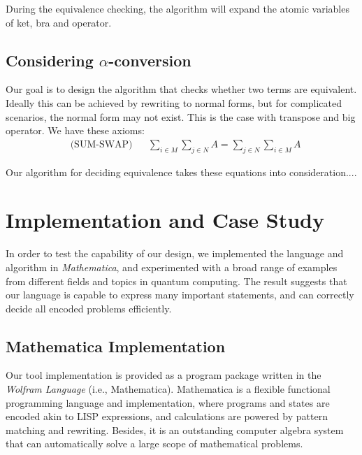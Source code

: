 \documentclass[manuscript, review, timestamp]{acmart}
\begin{document}
During the equivalence checking, the algorithm will expand the atomic variables of ket, bra and operator.

\subsection{Considering $\alpha$-conversion}

Our goal is to design the algorithm that checks whether two terms are equivalent. Ideally this can be achieved by rewriting to normal forms, but for complicated scenarios, the normal form may not exist. This is the case with transpose and big operator. We have these axioms: 
\begin{align*}
& \text{(SUM-SWAP)} && \sum_{i \in M} \sum_{j \in N} A = \sum_{j \in N} \sum_{i \in M} A 
\end{align*}

Our algorithm for deciding equivalence takes these equations into consideration....



\section{Implementation and Case Study}

In order to test the capability of our design, we implemented the language and algorithm in \textit{Mathematica}, and experimented with a broad range of examples from different fields and topics in quantum computing. The result suggests that our language is capable to express many important statements, and can correctly decide all encoded problems efficiently.

\subsection{Mathematica Implementation}
Our tool implementation is provided as a program package written in the \textit{Wolfram Language} (i.e., Mathematica). 
Mathematica is a flexible functional programming language and implementation, where programs and states are encoded akin to LISP expressions, and calculations are powered by pattern matching and rewriting. Besides, it is an outstanding computer algebra system that can automatically solve a large scope of mathematical problems.
\end{document}
